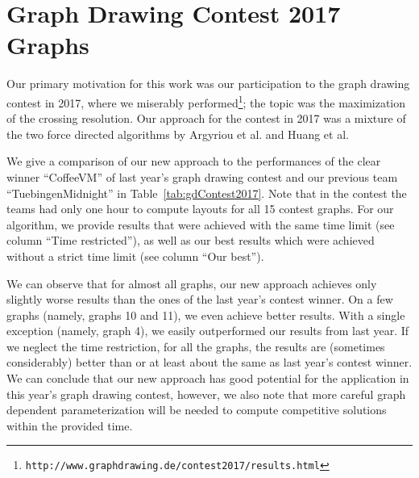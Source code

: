 \documentclass[runningheads]{llncs}
\begin{document}
\section{Graph Drawing Contest 2017 Graphs}
\label{app:contest}

Our primary motivation for this work was our participation to the graph drawing contest in 2017, where we miserably performed\footnote{\texttt{http://www.graphdrawing.de/contest2017/results.html}}; the topic was the maximization of the crossing resolution. Our approach for the contest in 2017 was a mixture of the two force directed algorithms by Argyriou et al. and Huang et al.

We give a comparison of our new approach to the performances of the clear winner ``CoffeeVM'' of last year's graph drawing contest and our previous team ``TuebingenMidnight'' in Table~\ref{tab:gdContest2017}. Note that in the contest the teams had only one hour to compute layouts for all 15 contest graphs. For our algorithm, we provide results that were achieved with the same time limit (see column ``Time restricted''), as well as our best results which were achieved without a strict time limit (see column ``Our best'').

We can observe that for almost all graphs, our new approach achieves only slightly worse results than the ones of the last year's contest winner. On a few graphs (namely, graphs 10 and 11), we even achieve better results. With a single exception (namely, graph 4), we easily outperformed our results from last year.
If we neglect the time restriction, for all the graphs, the results  are (sometimes considerably) better than or at least about the same as last year's contest winner. We can conclude that our new approach has good potential for the application in this year's graph drawing contest, however, we also note that more careful graph dependent parameterization will be needed to compute competitive solutions within the provided time.
\end{document}
